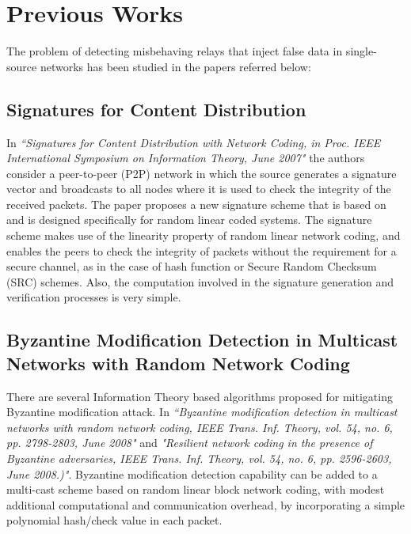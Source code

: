 \documentclass[conference]{IEEEtran}
\begin{document}
\section{Previous Works}
The problem of detecting misbehaving relays that inject false data in single-source networks has been studied in the papers referred below:

\subsection{Signatures for Content Distribution}
In \textit{“Signatures for Content Distribution with Network Coding, in Proc. IEEE International Symposium on Information Theory, June 2007"} \cite{b2} the authors consider a peer-to-peer (P2P) network in which the source generates a signature vector and broadcasts to all nodes where it is used to check the integrity of the received packets. The paper proposes a new signature scheme that is based on and is designed specifically for random linear coded systems. The signature scheme makes use of the linearity property of random linear network coding, and enables the peers to check the integrity of packets without the requirement for a secure channel, as in the case of hash function or Secure Random Checksum (SRC) schemes. Also, the computation involved in the signature generation and verification processes is very simple. 

\subsection{Byzantine Modification Detection in Multicast Networks with Random Network Coding}
There are several Information Theory based algorithms proposed for mitigating Byzantine modification attack. In \textit{“Byzantine modification detection in multicast networks with random network coding, IEEE Trans. Inf. Theory, vol. 54, no. 6, pp. 2798-2803, June 2008"} and \textit{"Resilient network coding in the presence of Byzantine adversaries, IEEE Trans. Inf. Theory, vol. 54, no. 6, pp. 2596-2603, June 2008.)"}. Byzantine modification detection capability can be added to a multi-cast scheme based on random linear block network coding, with modest additional computational and communication overhead, by incorporating a simple polynomial hash/check value in each packet.
\end{document}
